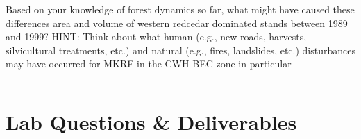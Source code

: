 \documentclass[
  letterpaper,
]{book}
\begin{document}
Based on your knowledge of forest dynamics so far, what might have
caused these differences area and volume of western redcedar dominated
stands between 1989 and 1999? HINT: Think about what human (e.g., new
roads, harvests, silvicultural treatments, etc.) and natural (e.g.,
fires, landslides, etc.) disturbances may have occurred for MKRF in the
CWH BEC zone in particular

\begin{center}\rule{0.5\linewidth}{0.5pt}\end{center}

\hypertarget{lab-questions-deliverables}{%
\section*{Lab Questions \&
Deliverables}\label{lab-questions-deliverables}}

\end{document}
